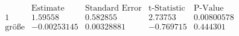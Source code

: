 \[\begin{array}{l|llll}
 \text{} & \text{Estimate} & \text{Standard Error} & \text{t-Statistic} & \text{P-Value} \\
\hline
 1 & 1.59558 & 0.582855 & 2.73753 & 0.00800578 \\
 \text{gr{\" o}{\ss}e} & -0.00253145 & 0.00328881 & -0.769715 & 0.444301 \\
\end{array}\]

